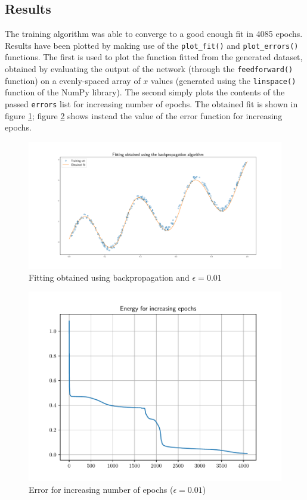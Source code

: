 \documentclass[letterpaper,headings=standardclasses]{scrartcl}
\begin{document}
\subsection{Results}

The training algorithm was able to converge to a good enough fit in 4085 epochs. Results have been plotted by making use of the \texttt{plot\_fit()} and \texttt{plot\_errors()} functions. The first is used to plot the function fitted from the generated dataset, obtained by evaluating the output of the network (through the \texttt{feedforward()} function) on a evenly-spaced array of $x$ values (generated using the \texttt{linspace()} function of the NumPy library). The second simply plots the contents of the passed \texttt{errors} list for increasing number of epochs. The obtained fit is shown in figure \ref{fit}; figure \ref{err} shows instead the value of the error function for increasing epochs.

\begin{figure}[h]
\centering
\includegraphics[width=\linewidth]{fit.pdf}
\caption{Fitting obtained using backpropagation and $\epsilon = 0.01$}
\label{fit}
\end{figure}

\begin{figure}[h]
\centering
\includegraphics[width=.7\linewidth]{err.pdf}
\caption{Error for increasing number of epochs ($\epsilon = 0.01$)}
\label{err}
\end{figure}
\end{document}
